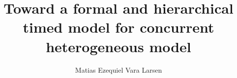 \documentclass[a4paper,12pt,twoside]{report}
\begin{document}
\parskip 0pt 

\title{\LARGE {\bf Toward a formal and hierarchical timed model for concurrent heterogeneous model}\\
 \vspace*{6mm}
}

\author{Matias Ezequiel Vara Larsen}

\normallinespacing
\maketitle

\preface





\body









%
%



\end{document}
